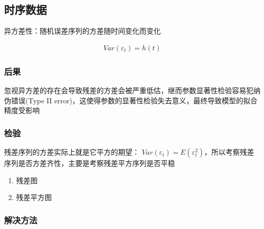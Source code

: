 \documentclass[12pt]{book}
\begin{document}
\subsection{时序数据}









异方差性：随机误差序列的方差随时间变化而变化

\begin{gather*}
    Var(\varepsilon_t)=h(t)
\end{gather*}


\subsubsection{后果}
忽视异方差的存在会导致残差的方差会被严重低估，继而参数显著性检验容易犯纳伪错误(Type II error)，这使得参数的显著性检验失去意义，最终导致模型的拟合精度受影响

\subsubsection{检验}

残差序列的方差实际上就是它平方的期望：
$Var(\varepsilon_t)=E(\varepsilon_t^2)$，所以考察残差序列是否方差齐性，主要是考察残差平方序列是否平稳

\begin{enumerate}[1.]
    \item 残差图
    \item 残差平方图
\end{enumerate}


\subsubsection{解决方法}
\end{document}
